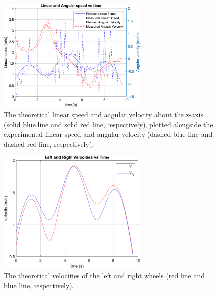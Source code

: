\begin{figure}[h]
    \centering
    \includegraphics[width=0.65\textwidth]{img/measured_speeds.png}
    \caption{The theoretical linear speed and angular velocity about the z-axis (solid blue line and solid red line, respectively), plotted alongside the experimental linear speed and angular velocity (dashed blue line and dashed red line, respectively).}
    \label{fig:planned_wheelspeed1}
\end{figure}

\begin{figure}[h]
    \centering
    \includegraphics[width=0.65\textwidth]{img/planned_wheelspeed.png}
    \caption{The theoretical velocities of the left and right wheels (red line and blue line, respectively).}
    \label{fig:planned_wheelspeed2}
\end{figure}

